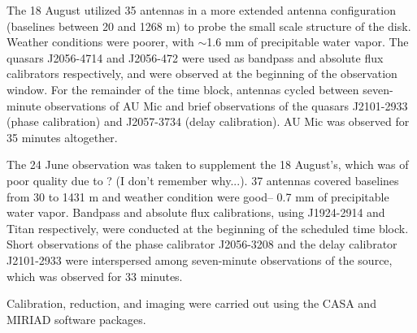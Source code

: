 \documentclass[a4paper]{tufte-handout}
\begin{document}
The 18 August utilized 35 antennas in a more extended antenna configuration (baselines between 20 and 1268 m) to probe the small scale structure of the disk. Weather conditions were poorer, with $\sim$1.6 mm of precipitable water vapor. The quasars J2056-4714 and J2056-472 were used as bandpass and absolute flux calibrators respectively, and were observed at the beginning of the observation window. For the remainder of the time block, antennas cycled between seven-minute observations of AU Mic and brief observations of the quasars J2101-2933 (phase calibration) and J2057-3734 (delay calibration). AU Mic was observed for 35 minutes altogether.

The 24 June observation was taken to supplement the 18 August's, which was of poor quality due to ? (I don't remember why...). 37 antennas covered baselines from 30 to 1431 m and weather condition were good-- 0.7 mm of precipitable water vapor. Bandpass and absolute flux calibrations, using J1924-2914 and Titan respectively, were conducted at the beginning of the scheduled time block. Short observations of the phase calibrator J2056-3208 and the delay calibrator J2101-2933 were interspersed among seven-minute observations of the source, which was observed for 33 minutes.

Calibration, reduction, and imaging were carried out using the CASA and MIRIAD software packages.
\end{document}
